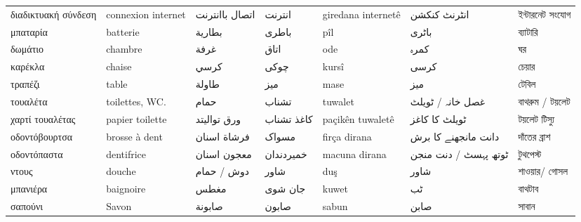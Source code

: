 \begin{longtable}{p{3.5cm} p{3.5cm} p{3.5cm} p{3.5cm} p{3.5cm} p{3.5cm} p{3.5cm} }
 διαδικτυακή σύνδεση & connexion internet          & اتصال باانترنت                  & انترنت     & giredana internetê & انٹرنٹ کنکشن         & ইন্টারনেট সংযোগ                  \\
 μπαταρία            & batterie                    & بطارية                          & باطری      & pîl                & باٹری                & ব্যাটারি                         \\
 δωμάτιο             & chambre                     & غرفة                            & اتاق       & ode                & کمرہ                 & ঘর                               \\
 καρέκλα             & chaise                      & كرسي                            & چوکی       & kursî              & کرسی                 & চেয়ার                            \\
 τραπέζι             & table                       & طاولة                           & میز        & mase               & میز                  & টেবিল                            \\
 τουαλέτα            & toilettes, WC.              & حمام                            & تشناب      & tuwalet            & غصل خانہ / ٹویلٹ     & বাথরুম / টয়লেট                   \\
 χαρτί τουαλέτας     & papier toilette             & ورق تواليتد                     & کاغذ تشناب & paçikên tuwaletê   & ٹویلٹ کا کاغز        & টয়লেট টিস্যু                     \\
 οδοντόβουρτσα       & brosse à dent               & فرشاة اسنان                     & مسواک      & firça dirana       & دانت مانجھنے کا برش  & দাঁতের ব্রাশ                     \\
 οδοντόπαστα         & dentifrice                  & معجون اسنان                     & خمیردندان  & macuna dirana      & ٹوتھ پہسٹ / دنت منجن & টুথপেস্ট                         \\
 ντους               & douche                      & دوش / حمام                      & شاور       & duş                & شاور                 & শাওয়ার/ গোসল                     \\
 μπανιέρα            & baignoire                   & مغطس                            & جان شوی    & kuwet              & ٹب                   & বাথটাব                           \\
 σαπούνι             & Savon                       & صابونة                          & صابون      & sabun              & صابن                 & সাবান                            \\

\end{longtable}
